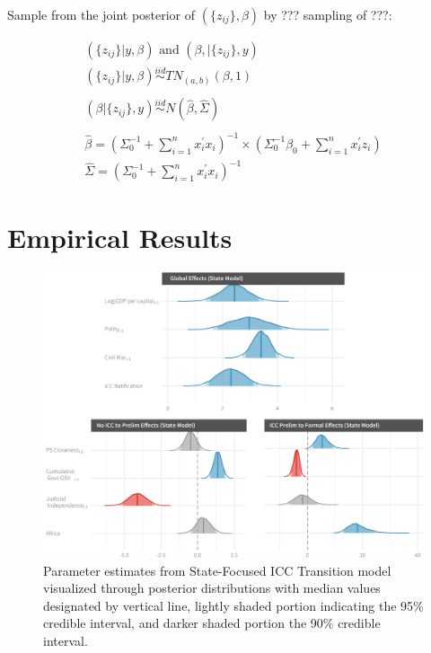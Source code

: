 Sample from the joint posterior of $(\{z_{ij}\},\beta)$ by ??? sampling of ???:

\begin{eqnarray}
	(\{z_{ij}\} | y,\beta)\text{ and }(\beta,|\{z_{ij}\},y) \nonumber \\
	(\{z_{ij}\} | y,\beta)\stackrel{iid}{\sim}TN_{(a,b)}(\beta,1) \nonumber \\
	\nonumber \\
	(\beta | \{z_{ij}\},y)\stackrel{iid}{\sim}N(\hat{\beta},\hat{\Sigma}) \nonumber \\
	\nonumber \\
	\hat{\beta} = (\Sigma_{0}^{-1}+\sum_{i=1}^{n} x_{i}^{'}x_{i})^{-1} \times (\Sigma_{0}^{-1}\beta_{0}+\sum_{i=1}^{n} x_{i}^{'}z_{i}) \nonumber \\
	\hat{\Sigma} = (\Sigma_{0}^{-1} + \sum_{i=1}^{n} x_{i}^{'}x_{i})^{-1} \nonumber
\end{eqnarray}

\section*{Empirical Results}

\begin{figure}
    \centering
    \includegraphics[width=1\textwidth]{stateCoefSumm.pdf}
    \caption{Parameter estimates from State-Focused ICC Transition model visualized through posterior distributions with median values designated by vertical line, lightly shaded portion indicating the 95\% credible interval, and darker shaded portion the 90\% credible interval.}
    \label{fig:stateModel}
\end{figure}


